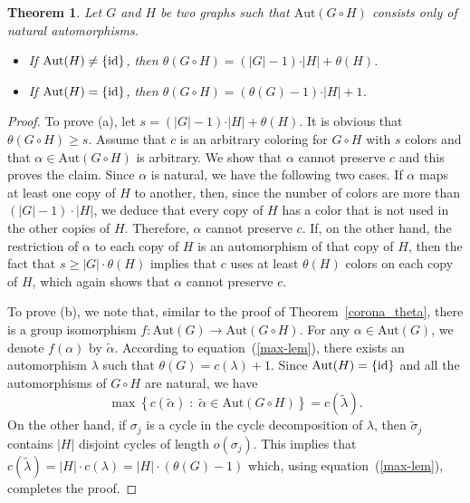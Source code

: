 \documentclass[12pt,a4paper, longbibliography]{article}
\newcommand{\id}{\ensuremath{\text{\rm id}}}
\newcommand{\aut}{\mathrm{Aut}}
\newtheorem{theorem}{{\color{THM} Theorem}}[section]
\theoremstyle{definition}
\numberwithin{equation}{section}
\begin{document}
	
	\begin{theorem}
		Let $G$ and $H$ be two graphs such that $\aut(G\circ H)$ consists only of natural automorphisms. 
		\begin{itemize}
			\item[(a)] If $\aut(H)\neq\{\id\}$, then $\theta(G\circ H) = (\vert G\vert - 1)\cdot \vert H\vert + \theta(H)$.
			
			\item[(b)] If $ \aut (H)=\{\id\}$, then $\theta\left(G\circ H \right) = \left(\theta(G) -1\right)\cdot \vert H\vert +1$.
		\end{itemize}
		
	\end{theorem}
	\begin{proof}
		To prove (a), 		let $s= (\vert G\vert - 1)\cdot \vert H\vert + \theta(H)$. It is obvious that  $\theta(G\circ H) \geq s$.
		Assume that $c$ is an arbitrary coloring for $G\circ H$ with $s$ colors and that $\alpha\in\aut (G\circ H)$ is arbitrary. We show that $\alpha$ cannot preserve  $c$ and this proves the claim. Since $\alpha$ is natural, we have the following two cases.
		If $\alpha$ maps at least one copy of $H$ to another, then, since the number of colors are more than $(|G| - 1)\cdot |H|$, we deduce that every copy of $H$ has a color that is not used in the other copies of $H$. Therefore, $\alpha$ cannot preserve $c$. If, on the other hand, the restriction of $\alpha$ to each copy of $H$ is an automorphism of that copy of $H$, then the fact that  $s\geq |G| \cdot \theta (H)$ implies that $c$ uses at least $\theta(H)$ colors on each copy of $H$, which  again  shows that $\alpha$ cannot preserve $c$.
		
		To prove (b), we note that, similar to the proof of Theorem~\ref{corona_theta}, there is a group  isomorphism $f:\aut(G)\to \aut(G\circ H)$. For any $\alpha\in \aut(G)$, we denote $f(\alpha)$ by $\tilde{\alpha}$.  According to equation~(\ref{max-lem}), there exists an automorphism $\lambda$ such that $\theta(G) = c( \lambda)+1$. Since $\aut(H) = \{\id\}$ and all the automorphisms of $G\circ H$ are natural, we have
		\[\max\left\{c( \tilde{\alpha}) \;: \; \tilde{\alpha} \in \aut(G\circ H)\right\} = c( \tilde{\lambda}). \]
		On the other hand, if $\sigma_j$ is a cycle in the cycle decomposition of $\lambda$, then $\tilde{\sigma}_j$ contains $|H|$ disjoint cycles of length $o(\sigma_j)$. This implies that $c(\tilde{\lambda}) = |H| \cdot c(\lambda) = |H|\cdot (\theta(G) - 1)$ 
		which, using equation~(\ref{max-lem}), completes  the proof.
	\end{proof}
	
\end{document}
